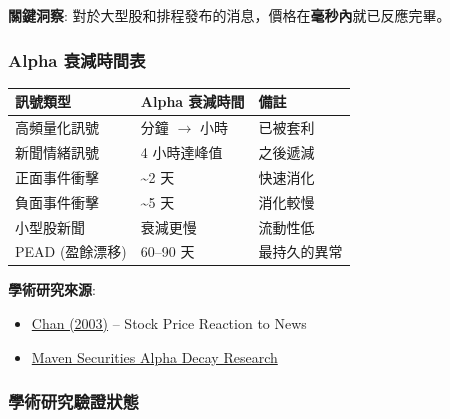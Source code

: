 \documentclass[11pt,a4paper]{article}
\begin{document}
\textbf{關鍵洞察}: 對於大型股和排程發布的消息，價格在\textbf{毫秒內}就已反應完畢。

\subsubsection*{Alpha 衰減時間表}

\begin{table}[H]
\centering
\begin{tabular}{@{}lll@{}}
\toprule
\textbf{訊號類型} & \textbf{Alpha 衰減時間} & \textbf{備註} \\
\midrule
高頻量化訊號 & 分鐘 $\rightarrow$ 小時 & 已被套利 \\
新聞情緒訊號 & 4 小時達峰值 & 之後遞減 \\
正面事件衝擊 & \textasciitilde 2 天 & 快速消化 \\
負面事件衝擊 & \textasciitilde 5 天 & 消化較慢 \\
小型股新聞 & 衰減更慢 & 流動性低 \\
PEAD (盈餘漂移) & 60--90 天 & 最持久的異常 \\
\bottomrule
\end{tabular}
\end{table}

\textbf{學術研究來源}:
\begin{itemize}
    \item \href{https://www.sciencedirect.com/science/article/abs/pii/S0304405X03001466}{Chan (2003)} -- Stock Price Reaction to News
    \item \href{https://www.mavensecurities.com/alpha-decay-what-does-it-look-like-and-what-does-it-mean-for-systematic-traders/}{Maven Securities Alpha Decay Research}
\end{itemize}

\subsubsection*{學術研究驗證狀態}
\end{document}
